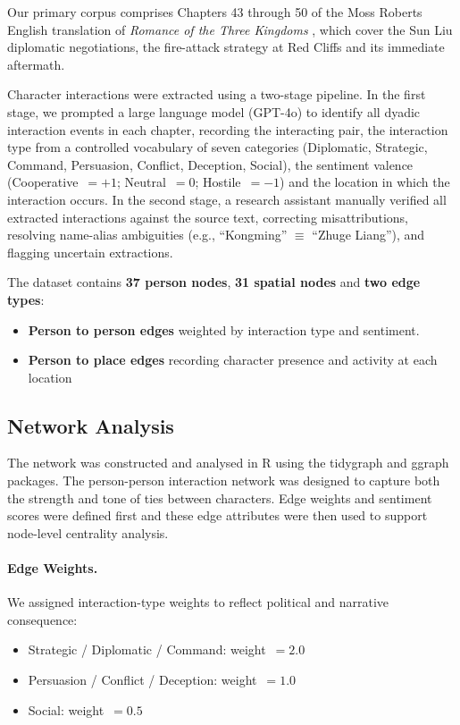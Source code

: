 \documentclass[12pt, a4paper]{article}
\newcommand{\booktitle}[1]{\textit{#1}}
\begin{document}
Our primary corpus comprises Chapters 43 through 50 of the Moss Roberts English translation of \booktitle{Romance of the Three Kingdoms}
\autocite{luo1994romance} , which cover the Sun Liu diplomatic negotiations, the fire-attack strategy at Red Cliffs and its immediate aftermath.

Character interactions were extracted using a two-stage pipeline.
In the first stage, we prompted a large language model (GPT-4o) to identify
all dyadic interaction events in each chapter, recording the
interacting pair, the interaction type from a controlled vocabulary of seven
categories (Diplomatic, Strategic, Command, Persuasion, Conflict, Deception,
Social), the sentiment valence (Cooperative~$= +1$; Neutral~$= 0$;
Hostile~$= -1$) and the location in which the interaction occurs.
In the second stage, a research assistant manually verified all extracted
interactions against the source text, correcting misattributions,
resolving name-alias ambiguities (e.g., ``Kongming'' $\equiv$ ``Zhuge Liang''),
and flagging uncertain extractions.

The dataset contains \textbf{37 person nodes}, \textbf{31 spatial nodes} and \textbf{two edge types}:

\begin{itemize}
    \item \textbf{Person to person edges} weighted by interaction type and sentiment.
    \item \textbf{Person to place edges} recording character presence and activity at each location
\end{itemize}


\subsection{Network Analysis}
\label{sec:network_methods}

The network was constructed and analysed in R using the tidygraph and ggraph packages. The person-person interaction network was designed to capture both the strength and tone of ties between characters. Edge weights and sentiment scores were defined first and these edge attributes were then used to support node-level centrality analysis. 

\paragraph{Edge Weights.}
We assigned interaction-type weights to reflect political and narrative
consequence:
\begin{itemize}[noitemsep]
  \item Strategic / Diplomatic / Command: weight~$= 2.0$
  \item Persuasion / Conflict / Deception: weight~$= 1.0$
  \item Social: weight~$= 0.5$
\end{itemize}
\end{document}
